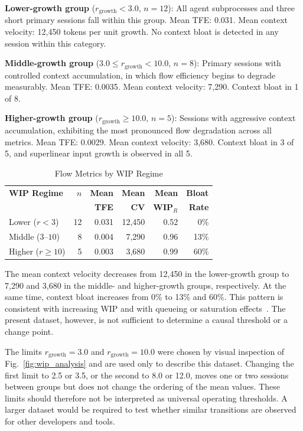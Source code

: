 \documentclass[journal]{IEEEtran}
\begin{document}
\textbf{Lower-growth group} ($r_{\text{growth}} < 3.0$, $n = 12$): All agent subprocesses and three short primary sessions fall within this group. Mean TFE: 0.031. Mean context velocity: 12,450 tokens per unit growth. No context bloat is detected in any session within this category.

\textbf{Middle-growth group} ($3.0 \leq r_{\text{growth}} < 10.0$, $n = 8$): Primary sessions with controlled context accumulation, in which flow efficiency begins to degrade measurably. Mean TFE: 0.0035. Mean context velocity: 7,290. Context bloat in 1 of 8.

\textbf{Higher-growth group} ($r_{\text{growth}} \geq 10.0$, $n = 5$): Sessions with aggressive context accumulation, exhibiting the most pronounced flow degradation across all metrics. Mean TFE: 0.0029. Mean context velocity: 3,680. Context bloat in 3 of 5, and superlinear input growth is observed in all 5.

\begin{table}[t]
\centering
\caption{Flow Metrics by WIP Regime}
\label{tab:wip_regimes}
\begin{tabular}{@{}lrrrrr@{}}
\toprule
\textbf{WIP Regime} & $n$ & \textbf{Mean} & \textbf{Mean} & \textbf{Mean} & \textbf{Bloat} \\
                     &     & \textbf{TFE}  & \textbf{CV}   & \textbf{WIP$_R$} & \textbf{Rate} \\
\midrule
Lower ($r < 3$)       & 12  & 0.031 & 12,450 & 0.52  & 0\%  \\
Middle ($3$--$10$) & 8  & 0.004 & 7,290  & 0.96  & 13\% \\
Higher ($r \geq 10$)  & 5   & 0.003 & 3,680  & 0.99  & 60\% \\
\bottomrule
\end{tabular}
\end{table}

The mean context velocity decreases from 12,450 in the lower-growth group to 7,290 and 3,680 in the middle- and higher-growth groups, respectively. At the same time, context bloat increases from 0\% to 13\% and 60\%. This pattern is consistent with increasing WIP and with queueing or saturation effects~\cite{kleinrock1975}. The present dataset, however, is not sufficient to determine a causal threshold or a change point.

The limits $r_{\text{growth}}=3.0$ and $r_{\text{growth}}=10.0$ were chosen by visual inspection of Fig.~\ref{fig:wip_analysis} and are used only to describe this dataset. Changing the first limit to 2.5 or 3.5, or the second to 8.0 or 12.0, moves one or two sessions between groups but does not change the ordering of the mean values. These limits should therefore not be interpreted as universal operating thresholds. A larger dataset would be required to test whether similar transitions are observed for other developers and tools.
\end{document}

